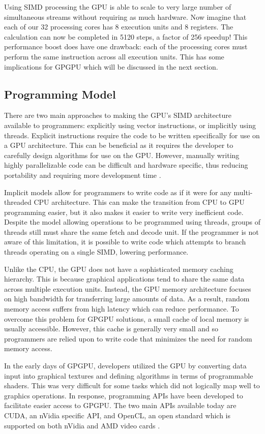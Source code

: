 Using SIMD processing the GPU is able to scale to very large number of simultaneous streams without requiring as much hardware. Now imagine that each of our 32 processing cores has 8 execution units and 8 registers. The calculation can now be completed in 5120 steps, a factor of 256 speedup! This performance boost does have one drawback: each of the processing cores must perform the same instruction across all execution units. This has some implications for GPGPU which will be discussed in the next section.

\subsection{Programming Model}

There are two main approaches to making the GPU's SIMD architecture available to programmers: explicitly using vector instructions, or implicitly using threads. Explicit instructions require the code to be written specifically for use on a GPU architecture. This can be beneficial as it requires the developer to carefully design algorithms for use on the GPU. However, manually writing highly parallelizable code can be difficult and hardware specific, thus reducing portability and requiring more development time \cite{gpgpu}.

Implicit models allow for programmers to write code as if it were for any multi-threaded CPU architecture. This can make the transition from CPU to GPU programming easier, but it also makes it easier to write very inefficient code. Despite the model allowing operations to be programmed using threads, groups of threads still must share the same fetch and decode unit. If the programmer is not aware of this limitation, it is possible to write code which attempts to branch threads operating on a single SIMD, lowering performance.

Unlike the CPU, the GPU does not have a sophisticated memory caching hierarchy. This is because graphical applications tend to share the same data across multiple execution units. Instead, the GPU memory architecture focuses on high bandwidth for transferring large amounts of data. As a result, random memory access suffers from high latency which can reduce performance. To overcome this problem for GPGPU solutions, a small cache of local memory is usually accessible. However, this cache is generally very small and so programmers are relied upon to write code that minimizes the need for random memory access.

In the early days of GPGPU, developers utilized the GPU by converting data input into graphical textures and defining algorithms in terms of programmable shaders. This was very difficult for some tasks which did not logically map well to graphics operations. In response, programming APIs have been developed to facilitate easier access to GPGPU. The two main APIs available today are CUDA, an nVidia specific API, and OpenCL, an open standard which is supported on both nVidia and AMD video cards \cite{gpgpu}.
